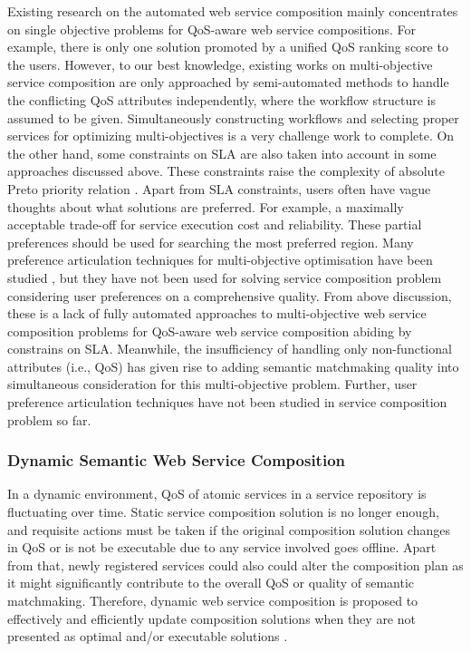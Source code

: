 Existing research on the automated web service composition mainly concentrates on single objective problems for QoS-aware web service compositions. For example, there is only one solution promoted by a unified QoS ranking score to the users. However, to our best knowledge, existing works on multi-objective service composition \cite{liu2005dynamic,wada2012e3,yao2009qos,yin2014hybrid} are only approached by semi-automated methods to handle the conflicting QoS attributes independently, where the workflow structure is assumed to be given. Simultaneously constructing workflows and selecting proper services for optimizing multi-objectives is a very challenge work to complete. On the other hand, some constraints on SLA are also taken into account in some approaches discussed above. These constraints raise the complexity of absolute Preto priority relation \cite{garey1979guide}. Apart from SLA constraints, users often have vague thoughts about what solutions are preferred. For example, a maximally acceptable trade-off for service execution cost and reliability. These partial preferences should be used for searching the most preferred region. Many preference articulation techniques for multi-objective optimisation have been studied \cite{branke2005integrating,branke2001guidance,giagkiozis2014pareto}, but they have not been used for solving service composition problem considering user preferences on a comprehensive quality. From above discussion, these is a lack of fully automated approaches to multi-objective web service composition problems for QoS-aware web service composition abiding by constrains on SLA. Meanwhile, the insufficiency of handling only non-functional attributes (i.e., QoS) has given rise to adding semantic matchmaking quality into simultaneous consideration for this multi-objective problem. Further, user preference articulation techniques have not been studied in service composition problem so far.

\subsubsection{Dynamic Semantic Web Service Composition}
In a dynamic environment, QoS of atomic services in a service repository is fluctuating over time. Static service composition solution is no longer enough, and requisite actions must be taken if the original composition solution changes in QoS or is not be executable due to any service involved goes offline. Apart from that, newly registered services could also could alter the composition plan as it might significantly contribute to the overall QoS or quality of semantic matchmaking. Therefore, dynamic web service composition is proposed to effectively and efficiently update composition solutions when they are not presented as optimal and/or executable solutions \cite{li2014fault}. 


